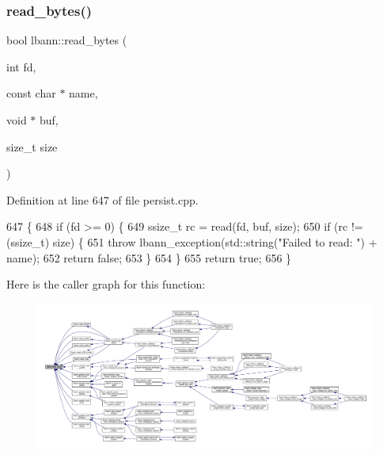 \subsubsection{\texorpdfstring{read\+\_\+bytes()}{read\_bytes()}}
{\footnotesize\ttfamily bool lbann\+::read\+\_\+bytes (\begin{DoxyParamCaption}\item[{int}]{fd,  }\item[{const char $\ast$}]{name,  }\item[{void $\ast$}]{buf,  }\item[{size\+\_\+t}]{size }\end{DoxyParamCaption})}



Definition at line 647 of file persist.\+cpp.


\begin{DoxyCode}
647                                                                        \{
648   \textcolor{keywordflow}{if} (fd >= 0) \{
649     ssize\_t rc = read(fd, buf, size);
650     \textcolor{keywordflow}{if} (rc != (ssize\_t) size) \{
651       \textcolor{keywordflow}{throw} lbann\_exception(std::string(\textcolor{stringliteral}{"Failed to read: "}) + name);
652       \textcolor{keywordflow}{return} \textcolor{keyword}{false};
653     \}
654   \}
655   \textcolor{keywordflow}{return} \textcolor{keyword}{true};
656 \}
\end{DoxyCode}
Here is the caller graph for this function\+:\nopagebreak
\begin{figure}[H]
\begin{center}
\leavevmode
\includegraphics[width=350pt]{namespacelbann_a85385e2a9e058b6720300b4cbdd2b1d0_icgraph}
\end{center}
\end{figure}
\mbox{\label{namespacelbann_a0306ed35d6d90cf4fbdce7a72ad62ca7}} 
